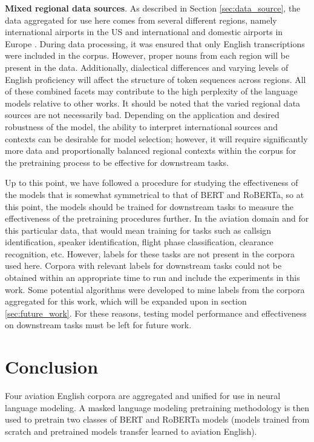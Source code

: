 \documentclass[12pt]{article}
\begin{document}
\textbf{Mixed regional data sources}. As described in Section \ref{sec:data_source}, the data aggregated for use here comes from several different regions, namely international airports in the US \cite{godfrey_air_1994} and international and domestic airports in Europe \cite{smidl_air_2019,hofbauer_atcosim_2008,szoke_detecting_2021}. During data processing, it was ensured that only English transcriptions were included in the corpus. However, proper nouns from each region will be present in the data. Additionally, dialectical differences and varying levels of English proficiency will affect the structure of token sequences across regions. All of these combined facets may contribute to the high perplexity of the language models relative to other works. It should be noted that the varied regional data sources are not necessarily bad. Depending on the application and desired robustness of the model, the ability to interpret international sources and contexts can be desirable for model selection; however, it will require significantly more data and proportionally balanced regional contexts within the corpus for the pretraining process to be effective for downstream tasks.

Up to this point, we have followed a procedure for studying the effectiveness of the models that is somewhat symmetrical to that of BERT and RoBERTa, so at this point, the models should be trained for downstream tasks to measure the effectiveness of the pretraining procedures further. In the aviation domain and for this particular data, that would mean training for tasks such as callsign identification, speaker identification, flight phase classification, clearance recognition, etc. However, labels for these tasks are not present in the corpora used here. Corpora with relevant labels for downstream tasks could not be obtained within an appropriate time to run and include the experiments in this work. Some potential algorithms were developed to mine labels from the corpora aggregated for this work, which will be expanded upon in section \ref{sec:future_work}. For these reasons, testing model performance and effectiveness on downstream tasks must be left for future work.

\section{Conclusion}\label{sec:conclusion}
Four aviation English corpora are aggregated and unified for use in neural language modeling. A masked language modeling pretraining methodology is
then used to pretrain two classes of BERT and RoBERTa models (models trained from scratch and pretrained models transfer learned to aviation English).
\end{document}
